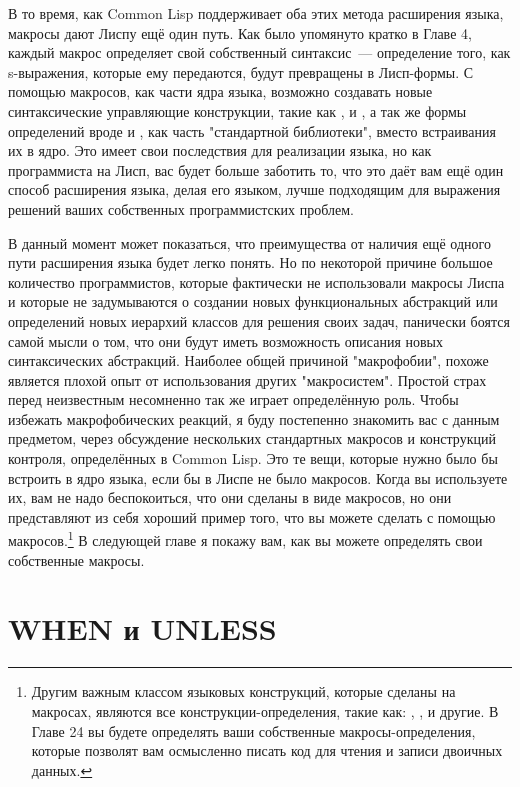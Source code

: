 В то время, как Common Lisp поддерживает оба этих метода расширения языка, макросы дают
Лиспу ещё один путь.  Как было упомянуто кратко в Главе 4, каждый макрос определяет свой
собственный синтаксис~--- определение того, как s-выражения, которые ему передаются, будут
превращены в Лисп-формы. С помощью макросов, как части ядра языка, возможно создавать
новые синтаксические управляющие конструкции, такие как ,  и
, а так же формы определений вроде  и , как
часть "стандартной библиотеки", вместо встраивания их в ядро. Это имеет свои последствия
для реализации языка, но как программиста на Лисп, вас будет больше заботить то, что это
даёт вам ещё один способ расширения языка, делая его языком, лучше подходящим для
выражения решений ваших собственных программистских проблем.

В данный момент может показаться, что преимущества от наличия ещё одного пути расширения
языка будет легко понять. Но по некоторой причине большое количество программистов,
которые фактически не использовали макросы Лиспа и которые не задумываются о создании
новых функциональных абстракций или определений новых иерархий классов для решения своих
задач, панически боятся самой мысли о том, что они будут иметь возможность описания новых
синтаксических абстракций. Наиболее общей причиной "макрофобии", похоже является плохой
опыт от использования других "макросистем". Простой страх перед неизвестным несомненно так
же играет определённую роль. Чтобы избежать макрофобических реакций, я буду постепенно
знакомить вас с данным предметом, через обсуждение нескольких стандартных макросов и
конструкций контроля, определённых в Common Lisp. Это те вещи, которые нужно было бы
встроить в ядро языка, если бы в Лиспе не было макросов. Когда вы используете их, вам не
надо беспокоиться, что они сделаны в виде макросов, но они представляют из себя хороший
пример того, что вы можете сделать с помощью макросов.\footnote{Другим важным классом
  языковых конструкций, которые сделаны на макросах, являются все конструкции-определения,
  такие как: , ,  и другие. В Главе 24 вы
  будете определять ваши собственные макросы-определения, которые позволят вам осмысленно
  писать код для чтения и записи двоичных данных.} В следующей главе я покажу вам, как вы
можете определять свои собственные макросы.

\section{WHEN и UNLESS}

